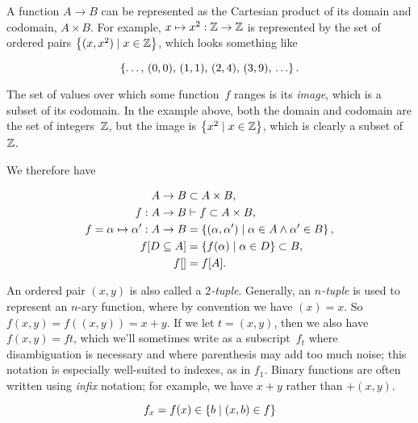 \indexsym{}
A function $A\rightarrow B$ can be represented as the Cartesian
  product of its domain and codomain, $A\times B$.
For example,
  $x\mapsto x^2 : \mathbb{Z}\rightarrow\mathbb{Z}$ is represented by the set of ordered
  pairs $\left\{(x,x^2) \mid x\in\mathbb{Z}\right\}$, which looks something like

\begin{equation*}
  \left\{\ldots,\,(0,0),\,(1,1),\,(2,4),\,(3,9),\,\ldots\right\}.
\end{equation*}

The set of values over which some function~$f$ ranges is its \emph{image},
  which is a subset of its codomain.
In the example above,
  both the domain and codomain are the set of integers~$\mathbb{Z}$,
  but the image is $\left\{x^2 \mid x\in\mathbb{Z}\right\}$,
    which is clearly a subset of~$\mathbb{Z}$.

We therefore have

\begin{align}
  A \rightarrow B &\subset A\times B, \\
  f : A \rightarrow B &\vdash f \subset A\times B, \\
  f = \alpha \mapsto \alpha' : A \rightarrow B
                  &= \left\{(\alpha,\alpha')
                            \mid \alpha\in A \land \alpha'\in B\right\}, \\
  f[D\subseteq A] &= \left\{f(\alpha) \mid \alpha\in D\right\} \subset B, \\
  f[] &= f[A].
\end{align}

An ordered pair $(x,y)$ is also called a \emph{$2$-tuple}.
Generally,
  an \emph{$n$-tuple} is used to represent an $n$-ary function,
    where by convention we have $(x)=x$.
So $f(x,y) = f((x,y)) = x+y$.
If we let $t=(x,y)$,
  then we also have $f(x,y) = ft$,
    which we'll sometimes write as a subscript~$f_t$ where disambiguation is
      necessary and where parenthesis may add too much noise;
        this notation is especially well-suited to indexes,
          as in $f_1$.
Binary functions are often written using \emph{infix} notation;
  for example, we have $x+y$ rather than $+(x,y)$.

\begin{equation}
  f_x = f(x) \in \left\{b \mid (x,b) \in f\right\}
\end{equation}


